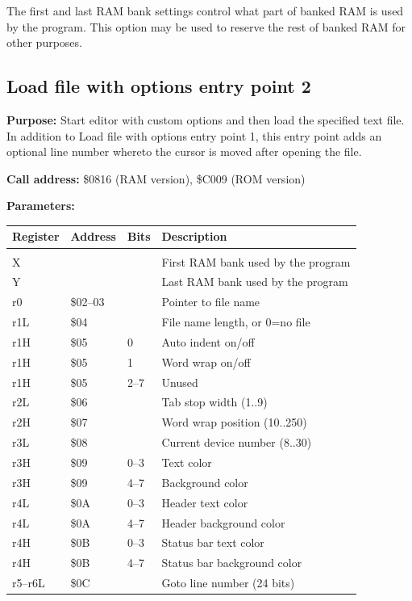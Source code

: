 \documentclass{article}
\begin{document}
        The first and last RAM bank settings control what part of banked RAM is
        used by the program. This option may be used to reserve the rest of banked RAM
        for other purposes.

    \subsection{Load file with options entry point 2}

        \textbf{Purpose:} Start editor with custom options and then load the specified text file. In addition to Load file with options entry point 1, this entry
        point adds an optional line number whereto the cursor is moved after opening the file.

        \textbf{Call address:} \$0816 (RAM version), \$C009 (ROM version)

        \textbf{Parameters:}

        \begin{longtable}[l]{l l l l}
	        \textbf{Register} & \textbf{Address} & \textbf{Bits} & \textbf{Description} \\
	        \hline \\
            X   &          &      & First RAM bank used by the program \\
            Y   &          &      & Last RAM bank used by the program \\
            r0  & \$02--03 &      & Pointer to file name \\
            r1L & \$04     &      & File name length, or 0=no file \\
            r1H & \$05     & 0    & Auto indent on/off \\
            r1H & \$05     & 1    & Word wrap on/off \\
            r1H & \$05     & 2--7 & Unused \\
            r2L & \$06     &      & Tab stop width (1..9) \\
            r2H & \$07     &      & Word wrap position (10..250) \\
            r3L & \$08     &      & Current device number (8..30) \\
            r3H & \$09     & 0--3 & Text color \\
            r3H & \$09     & 4--7 & Background color \\
            r4L & \$0A     & 0--3 & Header text color \\
            r4L & \$0A     & 4--7 & Header background color \\
            r4H & \$0B     & 0--3 & Status bar text color \\
            r4H & \$0B     & 4--7 & Status bar background color \\
            r5--r6L & \$0C   &      & Goto line number (24 bits) \\
        \end{longtable}
\end{document}

